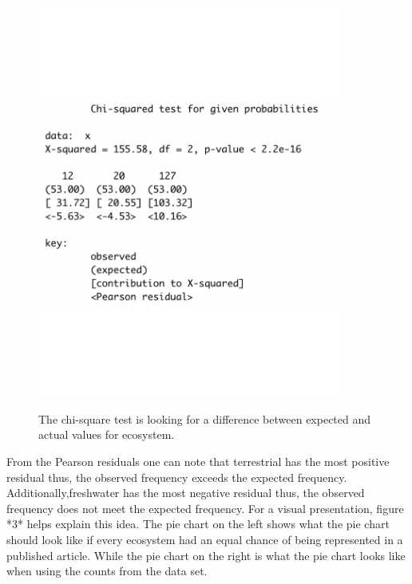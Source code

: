\documentclass[12pt, letterpaper]{article}
\begin{document}
\begin{figure}[h]
\begin{center}
	\includegraphics[width=10cm]{chi-eco-1.pdf}
	\label{fig: Chi-Square Test: Ecosystem}
	\caption{The chi-square test is looking for a difference between expected and actual values for ecosystem.}
\end{center}
\end{figure}

From the Pearson residuals one can note that terrestrial has the most positive residual thus, the observed frequency exceeds the expected frequency. Additionally,freshwater has the most negative residual thus, the observed frequency does not meet the expected frequency. For a visual presentation, figure *3* helps explain this idea. The pie chart on the left shows what the pie chart should look like if every ecosystem had an equal chance of being represented in a published article. While the pie chart on the right is what the pie chart looks like when using the counts from the data set. 
\end{document}
